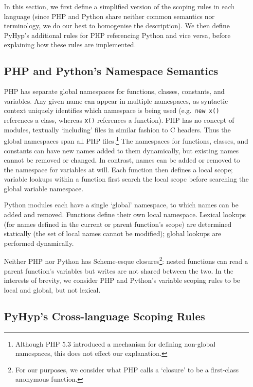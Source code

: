 \documentclass[a4paper,UKenglish]{lipics-v2016}
\newcommand{\ourvm}{PyHyp\xspace}
\begin{document}
In this section, we first define a simplified version of the scoping rules in
each language (since PHP and Python share neither common
semantics nor terminology, we do our best to homogenise the description).
We then define \ourvm's additional rules for PHP referencing Python
and vice versa, before explaining how these rules are implemented.


\subsection{PHP and Python's Namespace Semantics}
\label{scope:php namespace semantics}

PHP has separate global namespaces for functions, classes, constants, and variables.
Any given name can appear in multiple namespaces, as syntactic
context uniquely identifies which namespace is being used
(e.g.~\texttt{new x()} references a class, whereas
\texttt{x()} references a function). PHP has no concept of modules,
textually `including' files in similar fashion to C headers. Thus the
global namespaces span all PHP files.\footnote{Although PHP 5.3 introduced a
mechanism for defining non-global namespaces, this does not effect our explanation.}
The namespaces for functions, classes, and constants can have new names added to
them dynamically, but existing names cannot be removed or changed. In contrast,
names can be added or removed to the namespace for variables
at will. Each function then defines a local scope; variable lookups within a
function first search the local scope before searching the global variable
namespace.

Python modules each have a single `global' namespace, to which names can be
added and removed. Functions define their own local namespace. Lexical
lookups (for names defined in the current or parent function's scope)
are determined statically (the set of local names cannot be
modified); global lookups are performed dynamically.

Neither PHP nor Python has Scheme-esque closures\footnote{For our purposes, we
consider what PHP calls a `closure' to be a first-class anonymous function.}:
nested functions can read a parent function's variables but writes
are not shared between the two. In the interests of brevity, we consider
PHP and Python's variable scoping rules to be local
and global, but not lexical.


\subsection{\ourvm's Cross-language Scoping Rules}
\end{document}
